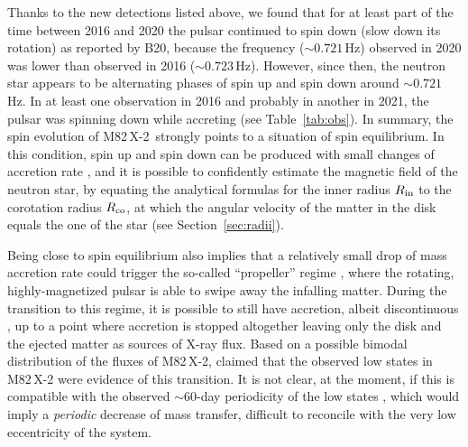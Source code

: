 \documentclass[twocolumn]{aastex631}
\newcommand{\Mtwo}{M82\,X-2\xspace}
\newcommand{\rin}{\ensuremath{R_{\rm in}}}
\newcommand{\rco}{\ensuremath{R_{\rm co}}}
\newcommand{\secref}{Section~\ref}
\begin{document}
Thanks to the new detections listed above, we found that for at least part of the time between 2016 and 2020 the pulsar continued to spin down (slow down its rotation) as reported by B20, because the frequency ($\sim0.721$\,Hz) observed in 2020 was lower than observed in 2016 ($\sim0.723$\,Hz).
However, since then, the neutron star appears to be alternating phases of spin up and spin down around $\sim0.721$\,Hz.
In at least one observation in 2016 and probably in another in 2021, the pulsar was spinning down while accreting (see Table~\ref{tab:obs}).
In summary, the spin evolution of \Mtwo\ strongly points to a situation of spin equilibrium.
In this condition, spin up and spin down can be produced with small changes of accretion rate \citep{dangeloAccretionDiscsTrapped2012}, and it is possible to confidently estimate the magnetic field of the neutron star, by equating the analytical formulas for the inner radius $\rin$ to the corotation radius $\rco$, at which the angular velocity of the matter in the disk equals the one of the star (see \secref{sec:radii}).

Being close to spin equilibrium also implies that a relatively small drop of mass accretion rate could trigger the so-called ``propeller'' regime \citep{illarionovWhyNumberGalactic1975}, where the rotating, highly-magnetized pulsar is able to swipe away the infalling matter.
During the transition to this regime, it is possible to still have accretion, albeit discontinuous \citep{romanovaPropellerRegimeDisk2004}, up to a point where accretion is stopped altogether leaving only the disk and the ejected matter as sources of X-ray flux.
Based on a possible bimodal distribution of the fluxes of \Mtwo, \citet{tsygankovPropellerEffectAction2016} claimed that the observed low states in \Mtwo were evidence of this transition.
It is not clear, at the moment, if this is compatible with the observed $\sim60$-day periodicity of the low states \citep{brightman60DaySuperorbital2019}, which would imply a \textit{periodic} decrease of mass transfer, difficult to reconcile with the very low eccentricity of the system.
\end{document}
